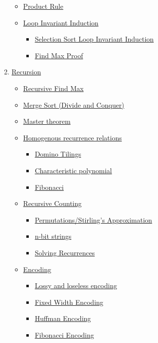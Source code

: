 \documentclass{article}
\begin{document}
\begin{spacing}{1.5}
\begin{enumerate}
\begin{itemize}
\begin{itemize}
    \end{itemize}
    \item \hyperref[sec:rproduct]{Product Rule}
    \item \hyperref[sec:invariant]{Loop Invariant Induction}
    \begin{itemize}
        \item \hyperref[sec:selectionsortproof]{Selection Sort Loop Invariant Induction}
        \item \hyperref[sec:findmaxproof]{Find Max Proof}
    \end{itemize}    
\end{itemize}
\item \hyperref[sec:recursion]{Recursion}
\begin{itemize}
    \item \hyperref[sec:rfindmaxproof]{Recursive Find Max}
    \item \hyperref[sec:mergesort]{Merge Sort (Divide and Conquer)}
    \item \hyperref[sec:master]{Master theorem}
    \item \hyperref[sec:homogenous] {Homogenous recurrence relations}
       \begin{itemize}
       \item \hyperref[sec:domino]{Domino Tilings}
        \item \hyperref[sec:characteristic]{Characteristic polynomial}
        \item \hyperref[sec:fibonacci]{Fibonacci}
    \end{itemize}
    \item \hyperref[sec:rcounting]{Recursive Counting}
    \begin{itemize}
        \item \hyperref[sec:stirling]{Permutations/Stirling's Approximation}
        \item \hyperref[sec:nstring]{n-bit strings}
        \item \hyperref[sec:solver]{Solving Recurrences}
    \end{itemize}
\item \hyperref[sec:encoding]{Encoding}
\begin{itemize}
    \item \hyperref[sec:loss]{Lossy and loseless encoding}
    \item  \hyperref[sec:fwencode]{Fixed Width Encoding}
    \item  \hyperref[sec:huffman]{Huffman Encoding}
    \item  \hyperref[sec:fibencode]{Fibonacci Encoding}

\end{itemize}
\end{itemize}
\end{enumerate}
\end{spacing}
\end{document}
